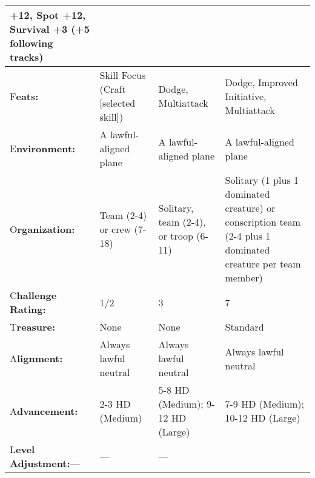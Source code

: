\documentclass{article}
\begin{document}
\begin{tabular}{|>{\raggedright}p{48pt}|>{\raggedright}p{84pt}|>{\raggedright}p{84pt}|>{\raggedright}p{84pt}|}
+12, Spot +12, Survival +3 (+5 following tracks)\tabularnewline
\hline
F\textbf{eats:} & Skill Focus (Craft [selected skill]) & Dodge, Multiattack & Dodge, 
Improved Initiative, Multiattack\tabularnewline
\hline
E\textbf{nvironment:} & A lawful-aligned plane & A lawful-aligned plane & A lawful-aligned 
plane\tabularnewline
\hline
O\textbf{rganization:} & Team (2-4) or crew (7-18) & Solitary, team (2-4), or troop 
(6-11) & Solitary (1 plus 1 dominated creature) or conscription team (2-4 plus 
1 dominated creature per team member)\tabularnewline
\hline
C{\small{}\textbf{hallenge Rating:}} & 1{\small{}/2} & 3 & 7\tabularnewline
\hline
T\textbf{reasure:} & None & None & Standard\tabularnewline
\hline
A\textbf{lignment:} & Always lawful neutral & Always lawful neutral & Always lawful 
neutral\tabularnewline
\hline
A\textbf{dvancement:} & 2-3 HD (Medium) & 5-8 HD (Medium); 9-12 HD (Large) & 7-9 
HD (Medium); 10-12 HD (Large)\tabularnewline
\hline
L\textbf{evel Adjustment:}--- & --- & --- & \tabularnewline
\hline
\end{tabular}
\end{document}
